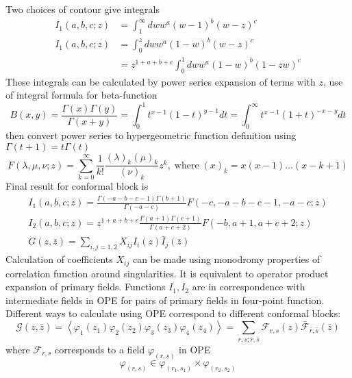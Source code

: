 \documentclass[12pt]{article}
\begin{document}
Two choices of contour \cite{difrancesco1997cft} give integrals
\begin{equation}
  \label{eq:63}
  \begin{array}{ll}
    I_{1}(a,b,c; z) &= \int_{1}^{\infty} dw w^{a} (w-1)^{b} (w-z)^{c}\\
    I_{1}(a,b,c; z) &= \int_{0}^{z} dw w^{a} (1-w)^{b} (w-z)^{c}\\
    &=z^{1+a+b+c}\int_{0}^{1}dw  w^{a}(1-w)^{b}(1-zw)^{c}
  \end{array}
\end{equation}
These integrals can be calculated by power series expansion of terms with $z$, use of integral
formula for beta-function 
\begin{equation}
  \label{eq:64}
    B(x,y)=\frac{\Gamma(x)\Gamma(y)}{\Gamma(x+y)} = \int_{0}^{1} t^{x-1} (1-t)^{y-1} dt =
    \int_{0}^{\infty} t^{x-1} (1+t)^{-x-y} dt
  \end{equation}
then convert power series to hypergeometric function definition using $\Gamma(t+1)=t\Gamma(t)$
\begin{equation}  
  F(\lambda,\mu,\nu; z)=\sum_{k=0}^{\infty}\frac{1}{k!}\frac{(\lambda)_{k}(\mu)_{k}}{(\nu)_{k}}
  z^{k}, \;\mbox{where}\; (x)_{k}=x(x-1)\dots (x-k+1)
\end{equation}
Final result for conformal block is
\begin{eqnarray}
  \label{eq:65}
  I_{1}(a,b,c;z)=\frac{\Gamma(-a-b-c-1)\Gamma(b+1)}{\Gamma(-a-c)} F(-c,-a-b-c-1,-a-c; z)\\
  I_{2}(a,b,c;z)=z^{1+a+b+c}\frac{\Gamma(a+1)\Gamma(c+1)}{\Gamma(a+c+2)} F(-b,a+1,a+c+2; z)\\
  G(z,\bar z)=\sum_{i,j=1,2}X_{ij} I_{i}(z) \bar I_{j}(\bar z)
\end{eqnarray}
Calculation of coefficients $X_{ij}$ can be made using monodromy properties of correlation function
around singularities. It is equivalent to operator product expansion of primary fields. Functions
$I_{1}, I_{2}$ are in correspondence with intermediate fields in OPE for pairs of primary fields in
four-point function. Different ways to calculate using OPE correspond to different conformal blocks:
\begin{equation}
  \label{eq:66}
  \mathcal{G}(z,\bar z) =
  \left<\varphi_{1}(z_{1})\varphi_{2}(z_{2})\varphi_{3}(z_{3})\varphi_{4}(z_{4})\right> =
  \sum_{r,s;\bar r, \bar s}\mathcal{F}_{r,s}(z) \bar{\mathcal{F}}_{\bar r,\bar s}(\bar z)
\end{equation}
where $\mathcal{F}_{r,s}$ corresponds to a field $\varphi_{(r,s)}$ in OPE
\begin{equation}
  \label{eq:67}
  \varphi_{(r,s)}\in \varphi_{(r_{1},s_{1})}\times \varphi_{(r_{2},s_{2})}
\end{equation}
\end{document}
